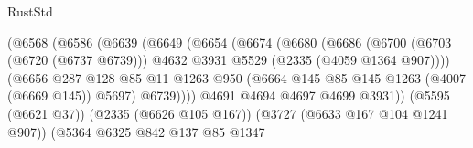 \begin{lexlean}{RustStd}
\begin{coremodule}
                                        (@6568
                                          (@6586
                                            (@6639
                                              (@6649
                                                (@6654
                                                  (@6674
                                                    (@6680
                                                      (@6686
                                                        (@6700
                                                          (@6703 (@6720 (@6737 @6739)))
                                                          @4632
                                                          @3931
                                                          @5529
                                                          (@2335 (@4059 @1364 @907))))
                                                      (@6656
                                                        @287
                                                        @128
                                                        @85
                                                        @11
                                                        @1263
                                                        @950
                                                        (@6664
                                                          @145
                                                          @85
                                                          @145
                                                          @1263
                                                          (@4007 (@6669 @145))
                                                          @5697)
                                                        @6739))))
                                                @4691
                                                @4694
                                                @4697
                                                @4699
                                                @3931))
                                            (@5595 (@6621 @37))
                                            (@2335 (@6626 @105 @167))
                                            (@3727 (@6633 @167 @104 @1241 @907))
                                            (@5364
                                              @6325
                                              @842
                                              @137
                                              @85
                                              @1347

\end{coremodule}
\end{lexlean}
